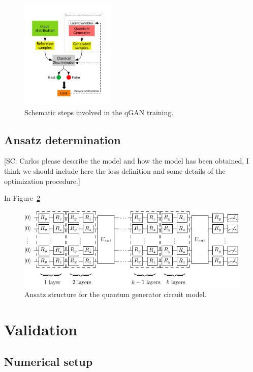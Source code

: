 \documentclass[twocolumn,preprintnumbers,superscriptaddress]{revtex4-2}
\begin{document}
\begin{figure}
  \includegraphics[width=0.4\textwidth]{plots/scheme.pdf}
  \caption{\label{fig:scheme} Schematic steps involved in the qGAN training.}
\end{figure}

\subsection{Ansatz determination}

{\color{red}[SC: Carlos please describe the model and how the model has been obtained, I think we should include here the loss definition and some details of the optimization procedure.]}

In Figure~\ref{fig:circuit}

\begin{figure}
  \includegraphics[width=1.0\columnwidth]{plots/ansatz1.pdf}
  \caption{\label{fig:circuit}Ansatz structure for the quantum generator circuit model.}
\end{figure}

\section{Validation}
\label{sec:validation}

\subsection{Numerical setup}
\end{document}
